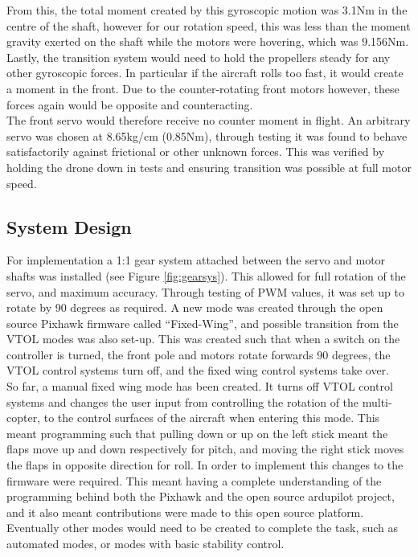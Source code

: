 From this, the total moment created by this gyroscopic motion was 3.1Nm in the centre of the shaft, however for our rotation speed, this was less than the moment gravity exerted on the shaft while the motors were hovering, which was 9.156Nm. Lastly, the transition system would need to hold the propellers steady for any other gyroscopic forces. In particular if the aircraft rolls too fast, it would create a moment in the front. Due to the counter-rotating front motors however, these forces again would be opposite and counteracting.\\

The front servo would therefore receive no counter moment in flight. An arbitrary servo was chosen at 8.65kg/cm (0.85Nm), through testing it was found to behave satisfactorily against frictional or other unknown forces. This was verified by holding the drone down in tests and ensuring transition was possible at full motor speed.

\subsection{System Design}
For implementation a 1:1 gear system attached between the servo and motor shafts was installed (see Figure \ref{fig:gearsys}). This allowed for full rotation of the servo, and maximum accuracy.  Through testing of PWM values, it was set up to rotate by 90 degrees as required. A new mode was created through the open source Pixhawk firmware called “Fixed-Wing”, and possible transition from the VTOL modes was also set-up. This was created such that when a switch on the controller is turned, the front pole and motors rotate forwards 90 degrees, the VTOL control systems turn off, and the fixed wing control systems take over.\\

So far, a manual fixed wing mode has been created. It turns off VTOL control systems and changes the user input from controlling the rotation of the multi-copter, to the control surfaces of the aircraft when entering this mode. This meant programming such that pulling down or up on the left stick meant the flaps move up and down respectively for pitch, and moving the right stick moves the flaps in opposite direction for roll.  In order to implement this changes to the firmware were required.  This meant having  a complete understanding of the programming behind both the Pixhawk and the open source ardupilot project, and it also meant contributions were made to this open source platform. Eventually other modes would need to be created to complete the task, such as automated modes, or modes with basic stability control. \\

